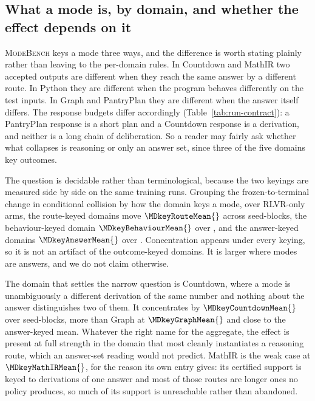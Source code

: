 \documentclass{article}
\newcommand{\1}{\mathbf 1}
\newcommand{\mb}{\textsc{ModeBench}}
\theoremstyle{remark}
\theoremstyle{definition}
\theoremstyle{plain}
\begin{document}
\subsection{What a mode is, by domain, and whether the effect depends on it}
\label{app:mode-keying}

\mb{} keys a mode three ways, and the difference is worth stating plainly
rather than leaving to the per-domain rules. In Countdown and MathIR two
accepted outputs are different when they reach the same answer by a different
route. In Python they are different when the program behaves differently on the
test inputs. In Graph and PantryPlan they are different when the answer itself
differs. The response budgets differ accordingly
(Table~\ref{tab:run-contract}): a PantryPlan response is a short plan and a
Countdown response is a derivation, and neither is a long chain of
deliberation. So a reader may fairly ask whether what collapses is reasoning or
only an answer set, since three of the five domains key outcomes.

The question is decidable rather than terminological, because the two keyings
are measured side by side on the same training runs. Grouping the
frozen-to-terminal change in conditional collision by how the domain keys a
mode, over RLVR-only arms, the route-keyed domains move $\MDkeyRouteMean{}$
across \MDkeyRouteN{} seed-blocks, the behaviour-keyed domain
$\MDkeyBehaviourMean{}$ over \MDkeyBehaviourN{}, and the answer-keyed domains
$\MDkeyAnswerMean{}$ over \MDkeyAnswerN{}. Concentration appears under every
keying, so it is not an artifact of the outcome-keyed domains. It is larger
where modes are answers, and we do not claim otherwise.

The domain that settles the narrow question is Countdown, where a mode is
unambiguously a different derivation of the same number and nothing about the
answer distinguishes two of them. It concentrates by $\MDkeyCountdownMean{}$
over \MDkeyCountdownN{} seed-blocks, more than Graph at $\MDkeyGraphMean{}$ and
close to the answer-keyed mean. Whatever the right name for the aggregate, the
effect is present at full strength in the domain that most cleanly instantiates
a reasoning route, which an answer-set reading would not predict. MathIR is the
weak case at $\MDkeyMathIRMean{}$, for the reason its own entry gives: its
certified support is keyed to derivations of one answer and most of those
routes are longer ones no policy produces, so much of its support is
unreachable rather than abandoned.
\end{document}
